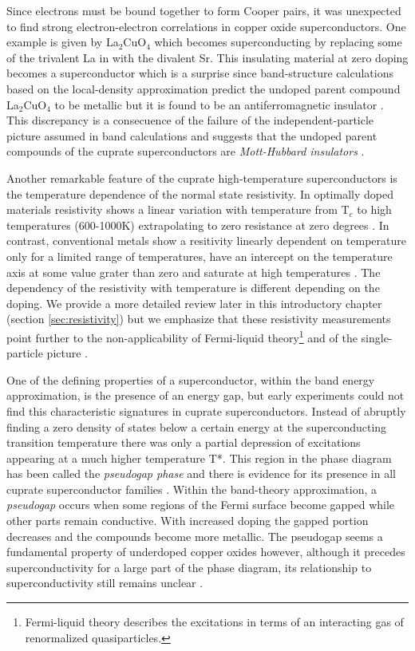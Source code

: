 Since electrons must be bound together to form Cooper pairs, it was unexpected to find strong electron-electron correlations in copper oxide superconductors. 
One example is given by La$_2$CuO$_4$ which becomes superconducting by replacing some of the trivalent La in with the divalent Sr. 
This insulating material at zero doping becomes a superconductor which is a surprise since band-structure calculations based on the local-density approximation predict the undoped parent compound La$_2$CuO$_4$ to be metallic but it is found to be an antiferromagnetic insulator \cite{Timusk1999}.
This discrepancy is a consecuence of the failure of the independent-particle picture assumed in band calculations and suggests that the undoped parent compounds of the cuprate superconductors are \textit{Mott-Hubbard insulators} \cite{Mott1949}.

Another remarkable feature of the cuprate high-temperature superconductors is the temperature dependence of the normal state resistivity.
In optimally doped materials resistivity shows a linear variation with temperature from T$_c$ to high temperatures (600-1000K) extrapolating to zero resistance at zero degrees \cite{Gurvitch1987}.
In contrast, conventional metals show a resitivity linearly dependent on temperature only for a limited range of temperatures, have an intercept on the temperature axis at some value grater than zero and saturate at high temperatures \cite{Timusk1999}.
The dependency of the resistivity with temperature is different depending on the doping. 
We provide a more detailed review later in this introductory chapter (section \ref{sec:resistivity}) but we emphasize that these resistivity measurements point further to the non-applicability of Fermi-liquid theory\footnote{Fermi-liquid theory describes the excitations in terms of an interacting gas of renormalized quasiparticles.} and of the single-particle picture \cite{Orenstein2000}.

One of the defining properties of a superconductor, within the band energy approximation, is the presence of an energy gap, but early experiments could not find this characteristic signatures in cuprate superconductors.
Instead of abruptly finding a zero density of states below a certain energy at the superconducting transition temperature there was only a partial depression of excitations appearing at a much higher temperature T*.
This region in the phase diagram has been called the \textit{pseudogap phase} and there is evidence for its presence in all cuprate superconductor families \cite{Timusk1999,Muller2007}.
Within the band-theory approximation, a \textit{pseudogap} occurs when some regions of the Fermi surface become gapped while other parts remain conductive. 
With increased doping the gapped portion decreases and the compounds become more metallic. 
The pseudogap seems a fundamental property of underdoped copper oxides however, although it precedes superconductivity for a large part of the phase diagram, its relationship to superconductivity still remains unclear \cite{Basov2005}.

